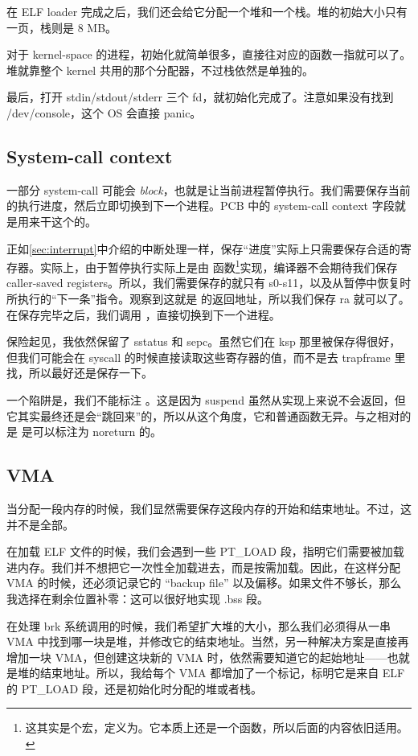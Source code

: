 在 ELF loader 完成之后，我们还会给它分配一个堆和一个栈。堆的初始大小只有一页，栈则是 8 MB。

对于 kernel-space 的进程，初始化就简单很多，直接往对应的函数一指就可以了。堆就靠整个 kernel 共用的那个分配器，不过栈依然是单独的。

最后，打开 stdin/stdout/stderr 三个 fd，就初始化完成了。注意如果没有找到 /dev/console，这个 OS 会直接 panic。

\subsection{System-call context}
\label{subsec:syscallctx}

一部分 system-call 可能会 \textit{block}，也就是让当前进程暂停执行。我们需要保存当前的执行进度，然后立即切换到下一个进程。PCB 中的 system-call context 字段就是用来干这个的。

正如\cref{sec:interrupt}中介绍的中断处理一样，保存“进度”实际上只需要保存合适的寄存器。实际上，由于暂停执行实际上是由  函数\footnote{这其实是个宏，定义为。它本质上还是一个函数，所以后面的内容依旧适用。}实现，编译器不会期待我们保存 caller-saved registers。所以，我们需要保存的就只有 s0-s11，以及从暂停中恢复时所执行的“下一条”指令。观察到这就是  的返回地址，所以我们保存 ra 就可以了。在保存完毕之后，我们调用 ，直接切换到下一个进程。

保险起见，我依然保留了 sstatus 和 sepc。虽然它们在 ksp 那里被保存得很好，但我们可能会在 syscall 的时候直接读取这些寄存器的值，而不是去 trapframe 里找，所以最好还是保存一下。

一个陷阱是，我们不能标注 。这是因为 suspend 虽然从实现上来说不会返回，但它其实最终还是会“跳回来”的，所以从这个角度，它和普通函数无异。与之相对的是  是可以标注为 noreturn 的。

\subsection{VMA}
\label{subsec:vma}

当分配一段内存的时候，我们显然需要保存这段内存的开始和结束地址。不过，这并不是全部。

在加载 ELF 文件的时候，我们会遇到一些 PT\_LOAD 段，指明它们需要被加载进内存。我们并不想把它一次性全加载进去，而是按需加载。因此，在这样分配 VMA 的时候，还必须记录它的 ``backup file'' 以及偏移。如果文件不够长，那么我选择在剩余位置补零：这可以很好地实现 .bss 段。

在处理 brk 系统调用的时候，我们希望扩大堆的大小，那么我们必须得从一串 VMA 中找到哪一块是堆，并修改它的结束地址。当然，另一种解决方案是直接再增加一块 VMA，但创建这块新的 VMA 时，依然需要知道它的起始地址——也就是堆的结束地址。所以，我给每个 VMA 都增加了一个标记，标明它是来自 ELF 的 PT\_LOAD 段，还是初始化时分配的堆或者栈。
